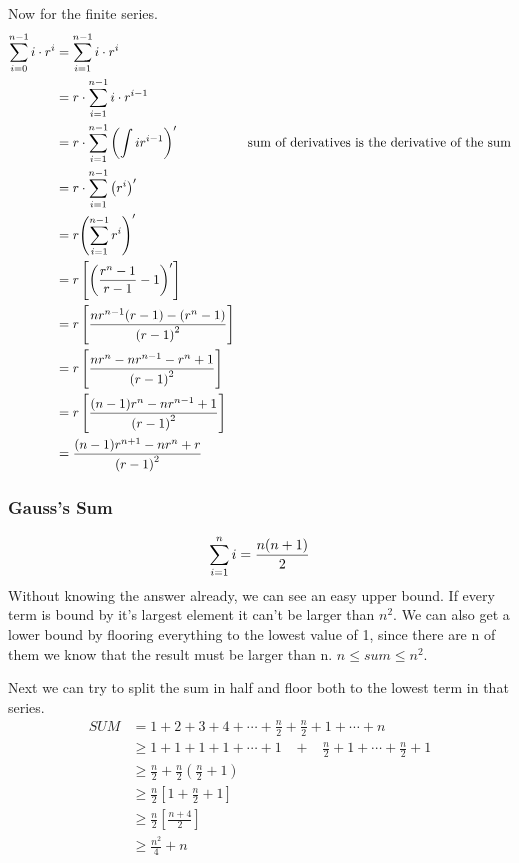 \documentclass[english, 10pt]{article}
\begin{document}
Now for the finite series.
\begin{align*}
    \sum_{i=0}^{n-1}i\cdot r^{i} &= \sum_{i=1}^{n-1}i\cdot r^{i} \\
    &= r\cdot\sum_{i=1}^{n-1}i\cdot r^{i-1} \\
    &= r\cdot\sum_{i=1}^{n-1}{\left( \int ir^{i-1} \right)}^{\prime} & \text{sum of derivatives is the derivative of the sum}\\
    &= r\cdot\sum_{i=1}^{n-1}{\left( r^i \right)}^{\prime} \\
    &= r{\left(\sum_{i=1}^{n-1} r^i \right)}^{\prime} \\
    &= r\left[{\left(\frac{r^n-1}{r-1}-1 \right)}^{\prime}\right] \\
    &= r\left[ \frac{nr^{n-1}(r-1)-(r^n-1)}{{(r-1)}^2} \right] \\
    &= r\left[ \frac{nr^n-nr^{n-1}-r^n+1}{{(r-1)}^2} \right] \\
    &= r\left[ \frac{(n-1)r^n-nr^{n-1}+1}{{(r-1)}^2} \right] \\
    &= \frac{(n-1)r^{n+1}-nr^{n}+r}{{(r-1)}^2} \\
\end{align*}

\subsubsection{Gauss's Sum}
$$\sum_{i=1}^{n} i = \frac{n(n+1)}{2} $$ Without knowing the answer already, we can
see an easy upper bound. If every term is bound by it's largest element it
can't be larger than $n^2$. We can also get a lower bound by flooring everything
to the lowest value of 1, since there are n of them we know that the result must
be larger than n. $ n \le sum\le n^2 $.

Next we can try to split the sum in half and floor both to the lowest term in that series.
\begin{align*}
    SUM &= 1+2+3+4+\cdots +\frac{n}{2} + \frac{n}{2}+1+ \cdots +n \\
    &\ge 1+1+1+1+ \cdots +1 \;\;\; + \;\;\; \frac{n}{2}+1 + \cdots + \frac{n}{2}+1 \\
    &\ge \frac{n}{2} + \frac{n}{2}\left( \frac{n}{2}+1 \right) \\
    &\ge \frac{n}{2}\left[ 1+ \frac{n}{2}+1 \right] \\
    &\ge \frac{n}{2}\left[ \frac{n+4}{2} \right] \\
    &\ge \frac{n^2}{4} +n \\
\end{align*}
\end{document}
